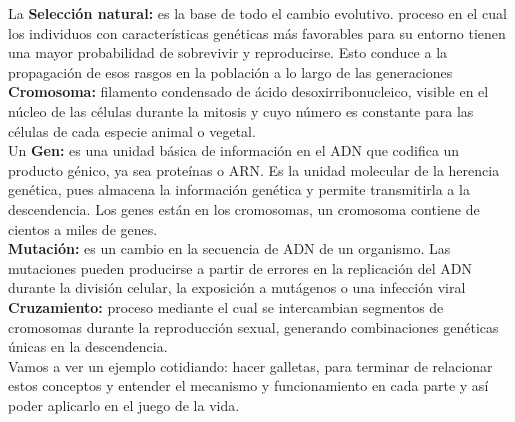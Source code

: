 La \textbf{Selección natural:} es la base de todo el cambio evolutivo. proceso en el cual 
los individuos con características genéticas más favorables para su entorno tienen una mayor 
probabilidad de sobrevivir y reproducirse. Esto conduce a la propagación de esos rasgos en 
la población a lo largo de las generaciones\\

\textbf{Cromosoma:} filamento condensado de ácido desoxirribonucleico, visible en el núcleo 
de las células durante la mitosis y cuyo número es constante para las células de cada 
especie animal o vegetal.\\ 

Un \textbf{Gen:} es una unidad básica de información en el ADN que codifica un producto génico, 
ya sea proteínas o ARN. Es la unidad molecular de la herencia genética, pues almacena la 
información genética y permite transmitirla a la descendencia. Los genes están en los cromosomas, 
un cromosoma contiene de cientos a miles de genes.\\

\textbf{Mutación:} es un cambio en la secuencia de ADN de un organismo. Las mutaciones pueden 
producirse a partir de errores en la replicación del ADN durante la división celular, la 
exposición a mutágenos o una infección viral \\

\textbf{Cruzamiento:} proceso mediante el cual se intercambian segmentos de cromosomas durante 
la reproducción sexual, generando combinaciones genéticas únicas en la descendencia.\\

Vamos a ver un ejemplo cotidiando: hacer galletas, para terminar de relacionar estos 
conceptos y entender el mecanismo y funcionamiento en cada parte y así poder aplicarlo en 
el juego de la vida. 

